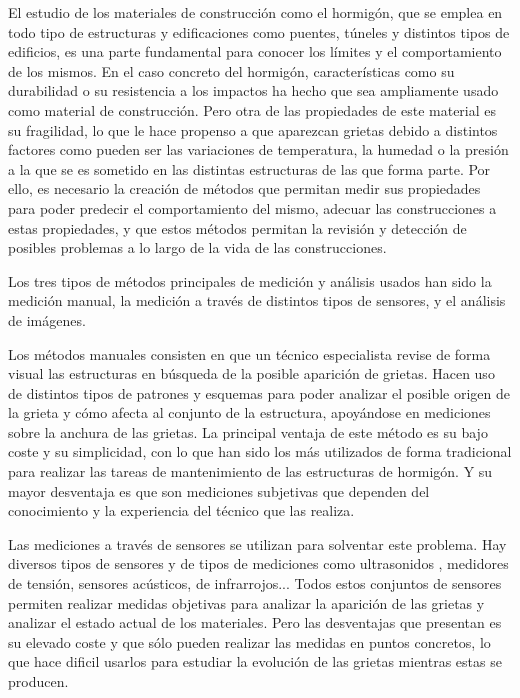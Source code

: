 
El estudio de los materiales de construcción como el hormigón, que se emplea en todo tipo de estructuras y edificaciones como puentes, túneles y distintos tipos de edificios, es una parte fundamental para conocer los límites y el comportamiento de los mismos. En el caso concreto del hormigón, características como su  durabilidad o su resistencia a los impactos ha hecho que sea ampliamente usado como material de construcción. Pero otra de las propiedades de este material es su fragilidad, lo que le hace propenso a que aparezcan grietas debido a distintos factores como pueden ser las variaciones de temperatura, la humedad o la presión a la que se es sometido en las distintas estructuras de las que forma parte. \cite{Zhang2024Review} Por ello, es necesario la creación de métodos que permitan medir sus propiedades para poder predecir el comportamiento del mismo, adecuar las construcciones a estas propiedades, y que estos métodos permitan la revisión y detección de posibles problemas a lo largo de la vida de las construcciones.

Los tres tipos de métodos principales de medición y análisis usados han sido \cite{MenaAlonso2023} la medición manual, la medición a través de distintos tipos de sensores, y el análisis de imágenes.

Los métodos manuales consisten en que un técnico especialista revise de forma visual las estructuras en búsqueda de la posible aparición de grietas. Hacen uso de distintos tipos de patrones y esquemas para poder analizar el posible origen de la grieta y cómo afecta al conjunto de la estructura, apoyándose en mediciones sobre la anchura de las grietas. La principal ventaja de este método es su bajo coste y su simplicidad, con lo que han sido los más utilizados de forma tradicional para realizar las tareas de mantenimiento de las estructuras de hormigón. Y su mayor desventaja es que son mediciones subjetivas que dependen del conocimiento y la experiencia del técnico que las realiza.

Las mediciones a través de sensores se utilizan para solventar este problema. Hay diversos tipos de sensores y de tipos de mediciones como ultrasonidos \cite{Lootens2020Continuous}, medidores de tensión, sensores acústicos, de infrarrojos... Todos estos conjuntos de sensores permiten realizar medidas objetivas para analizar la aparición de las grietas y analizar el estado actual de los materiales. Pero las desventajas que presentan es su elevado coste y que sólo pueden realizar las medidas en puntos concretos, lo que hace dificil usarlos para estudiar la evolución de las grietas mientras estas se producen.

